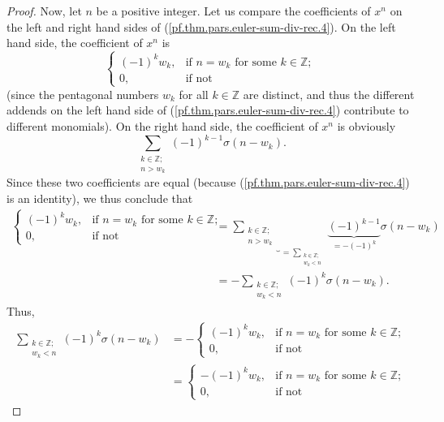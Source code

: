 \begin{proof}
Now, let $n$ be a positive integer. Let us compare the coefficients of $x^{n}$
on the left and right hand sides of (\ref{pf.thm.pars.euler-sum-div-rec.4}).
On the left hand side, the coefficient of $x^{n}$ is%
\[%
\begin{cases}
\left(  -1\right)  ^{k}w_{k}, & \text{if }n=w_{k}\text{ for some }%
k\in\mathbb{Z};\\
0, & \text{if not}%
\end{cases}
\]
(since the pentagonal numbers $w_{k}$ for all $k\in\mathbb{Z}$ are distinct,
and thus the different addends on the left hand side of
(\ref{pf.thm.pars.euler-sum-div-rec.4}) contribute to different monomials). On
the right hand side, the coefficient of $x^{n}$ is obviously%
\[
\sum_{\substack{k\in\mathbb{Z};\\n>w_{k}}}\left(  -1\right)  ^{k-1}%
\sigma\left(  n-w_{k}\right)  .
\]
Since these two coefficients are equal (because
(\ref{pf.thm.pars.euler-sum-div-rec.4}) is an identity), we thus conclude that%
\begin{align*}%
\begin{cases}
\left(  -1\right)  ^{k}w_{k}, & \text{if }n=w_{k}\text{ for some }%
k\in\mathbb{Z};\\
0, & \text{if not}%
\end{cases}
&  =\underbrace{\sum_{\substack{k\in\mathbb{Z};\\n>w_{k}}}}_{=\sum
_{\substack{k\in\mathbb{Z};\\w_{k}<n}}}\underbrace{\left(  -1\right)  ^{k-1}%
}_{=-\left(  -1\right)  ^{k}}\sigma\left(  n-w_{k}\right) \\
&  =-\sum_{\substack{k\in\mathbb{Z};\\w_{k}<n}}\left(  -1\right)  ^{k}%
\sigma\left(  n-w_{k}\right)  .
\end{align*}
Thus,%
\begin{align*}
\sum_{\substack{k\in\mathbb{Z};\\w_{k}<n}}\left(  -1\right)  ^{k}\sigma\left(
n-w_{k}\right)   &  =-%
\begin{cases}
\left(  -1\right)  ^{k}w_{k}, & \text{if }n=w_{k}\text{ for some }%
k\in\mathbb{Z};\\
0, & \text{if not}%
\end{cases}
\\
&  =%
\begin{cases}
-\left(  -1\right)  ^{k}w_{k}, & \text{if }n=w_{k}\text{ for some }%
k\in\mathbb{Z};\\
0, & \text{if not}%
\end{cases}

\end{align*}
\end{proof}
